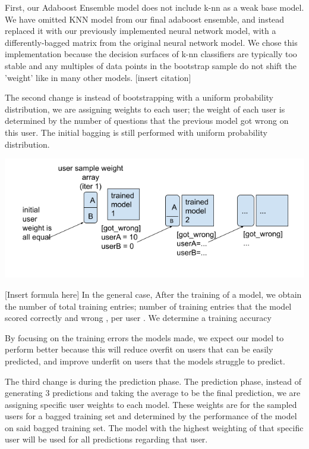 \documentclass{article}
\begin{document}
    First, our Adaboost Ensemble model does not include k-nn as a weak base model. We have omitted KNN model from our final adaboost ensemble, and instead replaced it with our previously implemented neural network model, with a differently-bagged matrix from the original neural network model. We chose this implementation because the decision surfaces of k-nn classifiers are typically too stable and any multiples of data points in the bootstrap sample do not shift the 'weight' like in many other models. [insert citation]

    The second change is instead of bootstrapping with a uniform probability distribution, we are assigning weights to each user; the weight of each user is determined by the number of questions that the previous model got wrong on this user. The initial bagging is still performed with uniform probability distribution.

    \includegraphics[scale=0.5]{figures/pb_f2.png}

    [Insert formula here]
    In the general case, After the training of a model, we obtain the number of total training entries; number of training entries that the model scored correctly {} and wrong {}, per user {}.
    We determine a training accuracy %

    By focusing on the training errors the models made, we expect our model to perform better because this will reduce overfit on users that can be easily predicted, and improve underfit on users that the models struggle to predict. 

    The third change is during the prediction phase. The prediction phase, instead of generating $3$ predictions and taking the average to be the final prediction, we are assigning specific user weights to each model. These weights are for the sampled users for a bagged training set and determined by the performance of the model on said bagged training set. The model with the highest weighting of that specific user will be used for all predictions regarding that user.
\end{document}
